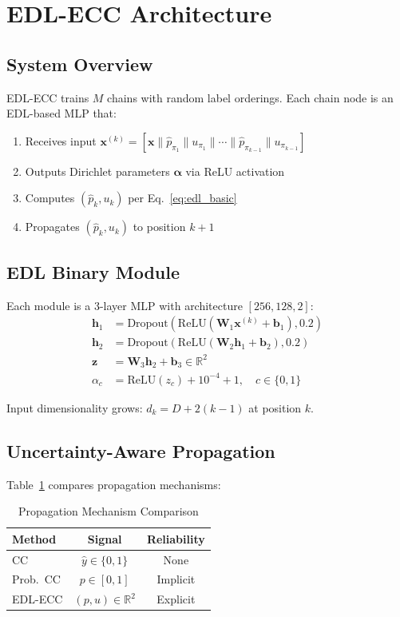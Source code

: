 \documentclass[conference]{IEEEtran}
\begin{document}
\section{EDL-ECC Architecture}

\subsection{System Overview}

EDL-ECC trains $M$ chains with random label orderings. Each chain node is an EDL-based MLP that:
\begin{enumerate}
\item Receives input $\mathbf{x}^{(k)} = [\mathbf{x} \| \hat{p}_{\pi_1} \| u_{\pi_1} \| \cdots \| \hat{p}_{\pi_{k-1}} \| u_{\pi_{k-1}}]$
\item Outputs Dirichlet parameters $\boldsymbol{\alpha}$ via ReLU activation
\item Computes $(\hat{p}_k, u_k)$ per Eq.~\eqref{eq:edl_basic}
\item Propagates $(\hat{p}_k, u_k)$ to position $k+1$
\end{enumerate}

\subsection{EDL Binary Module}

Each module is a 3-layer MLP with architecture $[256, 128, 2]$:
\begin{align}
\mathbf{h}_1 &= \mathrm{Dropout}(\mathrm{ReLU}(\mathbf{W}_1 \mathbf{x}^{(k)} + \mathbf{b}_1), 0.2) \\
\mathbf{h}_2 &= \mathrm{Dropout}(\mathrm{ReLU}(\mathbf{W}_2 \mathbf{h}_1 + \mathbf{b}_2), 0.2) \\
\mathbf{z} &= \mathbf{W}_3 \mathbf{h}_2 + \mathbf{b}_3 \in \mathbb{R}^2 \\
\alpha_c &= \mathrm{ReLU}(z_c) + 10^{-4} + 1, \quad c \in \{0,1\}
\end{align}

Input dimensionality grows: $d_k = D + 2(k-1)$ at position $k$.

\subsection{Uncertainty-Aware Propagation}

Table~\ref{tab:propagation} compares propagation mechanisms:

\begin{table}[h]
\centering
\caption{Propagation Mechanism Comparison}
\label{tab:propagation}
\small
\begin{tabular}{lcc}
\toprule
\textbf{Method} & \textbf{Signal} & \textbf{Reliability} \\ 
\midrule
CC & $\hat{y} \in \{0,1\}$ & None \\
Prob.~CC & $p \in [0,1]$ & Implicit \\
EDL-ECC & $(p, u) \in \mathbb{R}^2$ & Explicit \\ 
\bottomrule
\end{tabular}
\end{table}
\end{document}
